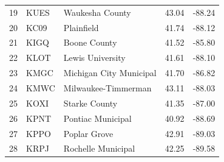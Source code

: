 \begin{tabular}{lllrr}
19 & KUES & Waukesha County & 43.04 & -88.24 \\
20 & KC09 & Plainfield & 41.74 & -88.12 \\
21 & KIGQ & Boone County & 41.52 & -85.80 \\
22 & KLOT & Lewis University & 41.61 & -88.10 \\
23 & KMGC & Michigan City Municipal & 41.70 & -86.82 \\
24 & KMWC & Milwaukee-Timmerman & 43.11 & -88.03 \\
25 & KOXI & Starke County & 41.35 & -87.00 \\
26 & KPNT & Pontiac Municipal & 40.92 & -88.69 \\
27 & KPPO & Poplar Grove & 42.91 & -89.03 \\
28 & KRPJ & Rochelle Municipal & 42.25 & -89.58 \\
\bottomrule
\end{tabular}


